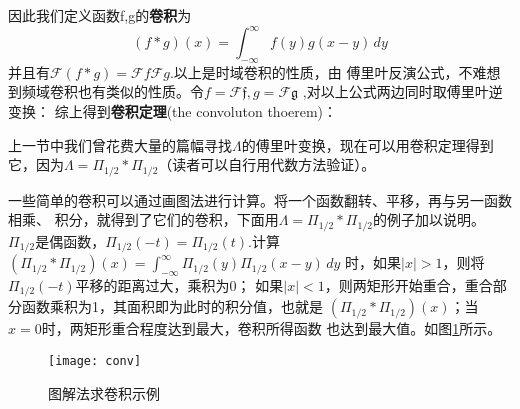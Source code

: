 \documentclass{ctexbook}
\begin{document}
因此我们定义函数f,g的\textbf{卷积}为
\begin{equation}
    (f*g)(x)=\int_{-\infty}^{\infty}f(y)g(x-y)\,dy
\end{equation}
并且有$\mathcal{F} (f*g)=\mathcal{F} f\mathcal{F} g$.以上是时域卷积的性质，由
傅里叶反演公式，不难想到频域卷积也有类似的性质。令$f=\mathcal{F} \mathfrak{f},g=\mathcal{F} \mathfrak{g}$
,对以上公式两边同时取傅里叶逆变换：
综上得到\textbf{卷积定理}(the convoluton thoerem)：

上一节中我们曾花费大量的篇幅寻找$\Lambda$的傅里叶变换，现在可以用卷积定理得到
它，因为$\Lambda=\Pi_{1/2}*\Pi_{1/2}$（读者可以自行用代数方法验证）。

一些简单的卷积可以通过画图法进行计算。将一个函数翻转、平移，再与另一函数相乘、
积分，就得到了它们的卷积，下面用$\Lambda=\Pi_{1/2}*\Pi_{1/2}$的例子加以说明。
$\Pi_{1/2}$是偶函数，$\Pi_{1/2}(-t)=\Pi_{1/2}(t)$.计算
$(\Pi_{1/2}*\Pi_{1/2})(x)=\int_{-\infty}^{\infty}\Pi_{1/2}(y)\Pi_{1/2}(x-y)\,dy$
时，如果$|x|>1$，则将$\Pi_{1/2}(-t)$平移的距离过大，乘积为0；
如果$|x|<1$，则两矩形开始重合，重合部分函数乘积为1，其面积即为此时的积分值，也就是
$(\Pi_{1/2}*\Pi_{1/2})(x)$；当$x=0$时，两矩形重合程度达到最大，卷积所得函数
也达到最大值。如图\ref{fig:conv}所示。
\begin{figure}[H]
    \centering
    \texttt{[image: conv]}
    \caption{图解法求卷积示例}\label{fig:conv}
\end{figure}
\end{document}
